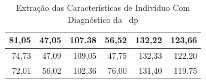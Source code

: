\begin{table}[h]
\begin{tabular}{|r|r|r|r|r|r|}
81,05                                                                                    & 47,05                                                                                    & 107.38                                                             & 56,52                                                             & 132,22            & 123,66           \\ \hline
74,73                                                                                    & 47,09                                                                                    & 109,05                                                             & 47,75                                                             & 132,33            & 122,20           \\ \hline
72,01                                                                                    & 56,02                                                                                    & 102,36                                                             & 76,00                                                             & 131,40            & 119.75      \\ \hline
\end{tabular}
\caption{Extração das Características de Indivíduo Com Diagnóstico da ~\ac{dp}}
\label{table:extracao-caracteristica}
\end{table}

